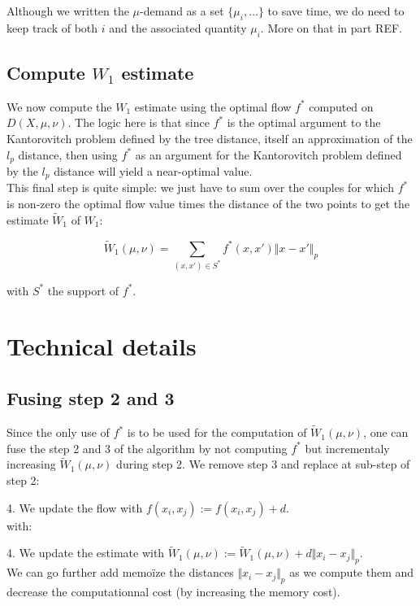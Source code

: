 \documentclass{article}
\begin{document}
Although we written the $\mu$-demand as a set $\lbrace \mu_i, \dots \rbrace$ to save time, we do need to keep track of both $i$ and the associated quantity $\mu_i$. More on that in part REF. 

\subsection{Compute $W_1$ estimate}
We now compute the $W_1$ estimate using the optimal flow $f^*$ computed on $D(X, \mu, \nu)$. The logic here is that since $f^*$ is the optimal argument to the Kantorovitch problem defined by the tree distance, itself an approximation of the $l_p$ distance, then using $f^*$ as an argument for the Kantorovitch problem defined by the $l_p$ distance will yield a near-optimal value.\\

This final step is quite simple: we just have to sum over the couples for which $f^*$ is non-zero the optimal flow value times the distance of the two points to get the estimate $\widetilde{W}_1$ of $W_1$:

$$
\widetilde{W}_1(\mu, \nu) = \sum_{(x, x') \in S^*} f^*(x, x') \Vert x - x' \Vert_p
$$ 

with $S^*$ the support of $f^*$.

\section{Technical details}

\subsection{Fusing step 2 and 3} \label{ssec:fuse23}
Since the only use of $f^*$ is to be used for the computation of $\widetilde{W}_1(\mu, \nu)$, one can fuse the step 2 and 3 of the algorithm by not computing $f^*$ but incrementaly increasing $\widetilde{W}_1(\mu, \nu)$ during step 2. We remove step 3 and replace at sub-step of step 2:

4. We update the flow with $f(x_i, x_j) := f(x_i, x_j) + d$.
\\
with:

4. We update the estimate with $\widetilde{W}_1(\mu, \nu) := \widetilde{W}_1(\mu, \nu) + d \Vert x_i - x_j \Vert_p $.
\\
We can go further add memoïze the distances $\Vert x_i - x_j \Vert_p$ as we compute them and decrease the computationnal cost (by increasing the memory cost).
\end{document}
